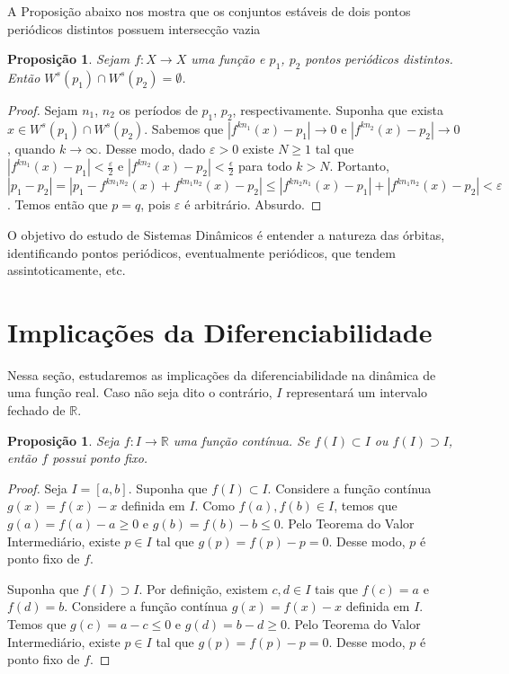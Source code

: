 \documentclass[a4paper, 12pt]{article}
\theoremstyle{definition}
\theoremstyle{plain}
\newtheorem{proposition}[definition]{Proposição}
\theoremstyle{plain}
\theoremstyle{plain}
\theoremstyle{definition}
\theoremstyle{remark}
\newcommand{\RR}{\mathbb{R}}
\begin{document}
A Proposição abaixo nos mostra que os conjuntos estáveis de dois pontos periódicos distintos possuem intersecção vazia
\begin{proposition}
Sejam $f: X \to X$ uma função e $p_1$, $p_2$ pontos periódicos distintos. Então $W^s(p_1) \cap W^s(p_2) = \emptyset$.
\end{proposition}

\begin{proof}
Sejam $n_1$, $n_2$ os períodos de $p_1$, $p_2$, respectivamente. Suponha que exista $x \in W^s(p_1) \cap W^s(p_2)$. Sabemos que $|f^{kn_1}(x) - p_1| \to 0$ e $|f^{kn_2}(x) - p_2| \to 0$, quando $k \to \infty$. Desse modo, dado $\varepsilon > 0$ existe $N \geq 1$ tal que $|f^{kn_1}(x) - p_1| < \frac{\varepsilon}{2}$ e $|f^{kn_2}(x) - p_2| < \frac{\epsilon}{2}$ para todo $k > N$. Portanto, $|p_1 - p_2| = |p_1 - f^{kn_1n_2}(x) + f^{kn_1n_2}(x) - p_2| \leq |f^{kn_2n_1}(x) - p_1| + |f^{kn_1n_2}(x) - p_2| < \varepsilon$. Temos então que $p = q$, pois $\varepsilon$ é arbitrário. Absurdo.
\end{proof}

O objetivo do estudo de Sistemas Dinâmicos é entender a natureza das órbitas, identificando pontos periódicos, eventualmente periódicos, que tendem assintoticamente, etc.

\section{Implicações da Diferenciabilidade}

Nessa seção, estudaremos as implicações da diferenciabilidade na dinâmica de uma função real. Caso não seja dito o contrário, $I$ representará um intervalo fechado de $\RR$.  

\begin{proposition}
\label{proposition 2 1}
Seja $f: I \to \RR$ uma função contínua. Se $f(I) \subset I$ ou $f(I) \supset I$, então $f$ possui ponto fixo.
\end{proposition}

\begin{proof}
Seja $I = [a, b]$. Suponha que $f(I) \subset I$. Considere a função contínua $g(x) = f(x) - x$ definida em $I$. Como $f(a), f(b) \in I$, temos que $g(a) = f(a) - a \geq 0$ e $g(b) = f(b) - b \leq 0$. Pelo Teorema do Valor Intermediário, existe $p \in I$ tal que $g(p) = f(p) -p = 0$. Desse modo, $p$ é ponto fixo de $f$.

Suponha que $f(I) \supset I$. Por definição, existem $c, d \in I$ tais que $f(c) = a$ e$f(d) = b$. Considere a função contínua $g(x) = f(x) - x$ definida em $I$. Temos que $g(c) = a - c \leq 0$ e $g(d) = b - d \geq 0$. Pelo Teorema do Valor Intermediário, existe $p \in I$ tal que $g(p) = f(p) - p = 0$. Desse modo, $p$ é ponto fixo de $f$.
\end{proof}
\end{document}
